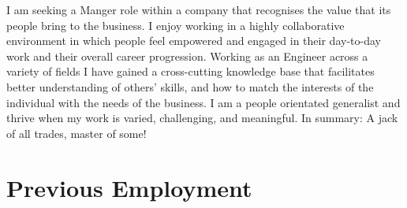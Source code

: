 \documentclass[]{deedy-resume-openfont-wjl}
\begin{document}
%
%


%
%
\begin{center}
  \vspace{-\topsep} %
  \huge\color{subheadings}
\end{center}

I am seeking a Manger role within a company that recognises the value that its people bring to the business.
I enjoy working in a highly collaborative environment in which people feel empowered and engaged in their day-to-day work and their overall career progression.
Working as an Engineer across a variety of fields I have gained a cross-cutting knowledge base that facilitates better understanding of others' skills, and how to match the interests of the individual with the needs of the business.
I am a people orientated generalist and thrive when my work is varied, challenging, and meaningful.
In summary: A jack of all trades, master of some!

%
%
\sectionsep
\section{Previous Employment}












\end{document}
